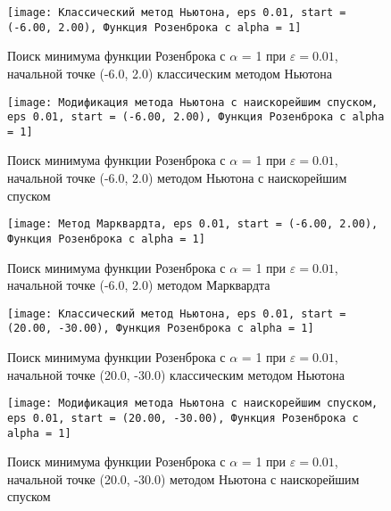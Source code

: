             \begin{figure}[H]
	        \centering
	        \texttt{[image: Классический метод Ньютона, eps 0.01, start = (-6.00, 2.00), Функция Розенброка с alpha = 1]}%
	        \caption{Поиск минимума функции Розенброка с $\alpha$ = 1 при $\varepsilon = 0.01$, начальной точке (-6.0, 2.0) классическим методом Ньютона}
	        \vspace*{-1.2cm}
            \end{figure}
            
            \begin{figure}[H]
	        \centering
	        \texttt{[image: Модификация метода Ньютона с наискорейшим спуском, eps 0.01, start = (-6.00, 2.00), Функция Розенброка с alpha = 1]}%
	        \caption{Поиск минимума функции Розенброка с $\alpha$ = 1 при $\varepsilon = 0.01$, начальной точке (-6.0, 2.0) методом Ньютона с наискорейшим спуском}
	        \vspace*{-1.2cm}
            \end{figure}
            
            \begin{figure}[H]
	        \centering
	        \texttt{[image: Метод Марквардта, eps 0.01, start = (-6.00, 2.00), Функция Розенброка с alpha = 1]}%
	        \caption{Поиск минимума функции Розенброка с $\alpha$ = 1 при $\varepsilon = 0.01$, начальной точке (-6.0, 2.0) методом Марквардта}
	        \vspace*{-1.2cm}
            \end{figure}
            
            \begin{figure}[H]
	        \centering
	        \texttt{[image: Классический метод Ньютона, eps 0.01, start = (20.00, -30.00), Функция Розенброка с alpha = 1]}%
	        \caption{Поиск минимума функции Розенброка с $\alpha$ = 1 при $\varepsilon = 0.01$, начальной точке (20.0, -30.0) классическим методом Ньютона}
	        \vspace*{-1.2cm}
            \end{figure}
            
            \begin{figure}[H]
	        \centering
	        \texttt{[image: Модификация метода Ньютона с наискорейшим спуском, eps 0.01, start = (20.00, -30.00), Функция Розенброка с alpha = 1]}%
	        \caption{Поиск минимума функции Розенброка с $\alpha$ = 1 при $\varepsilon = 0.01$, начальной точке (20.0, -30.0) методом Ньютона с наискорейшим спуском}
	        \vspace*{-1.2cm}
            \end{figure}
            
